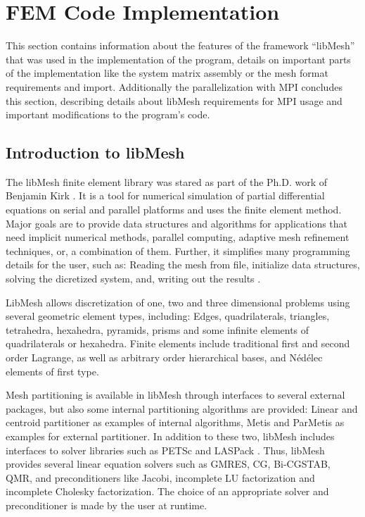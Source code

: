 \section{FEM Code Implementation}
 This section contains information about the features of the framework ``libMesh'' that was used in the implementation of the program, details on important parts of the implementation like the system matrix assembly or the mesh format requirements and import. Additionally the parallelization with MPI concludes this section, describing details about libMesh requirements for MPI usage and important modifications to the program's code.
 
 
 
 \subsection{Introduction to libMesh}\label{sec:Impl-Intro}
 The libMesh finite element library was stared as part of the Ph.D. work of Benjamin Kirk \cite{kirk2007adaptive}. It is a tool for numerical simulation of partial differential equations on serial and parallel platforms and uses the finite element method. Major goals are to provide data structures and algorithms for applications that need implicit numerical methods, parallel computing, adaptive mesh refinement techniques, or, a combination of them. Further, it simplifies many programming details for the user, such as: Reading the mesh from file, initialize data structures, solving the dicretized system, and, writing out the results \cite{kirk2013case}.
 
 LibMesh allows discretization of one, two and three dimensional problems using several geometric element types, including: Edges, quadrilaterals, triangles, tetrahedra, hexahedra, pyramids, prisms and some infinite elements of quadrilaterals or hexahedra. Finite elements include traditional first and second order Lagrange, as well as arbitrary order hierarchical bases, and N\'{e}d\'{e}lec elements of first type.
 
 Mesh partitioning is available in libMesh through interfaces to several external packages, but also some internal partitioning algorithms are provided: Linear and centroid partitioner as examples of internal algorithms, Metis and ParMetis \cite{karypis1998fast} as examples for external partitioner. In addition to these two, libMesh includes interfaces to solver libraries such as PETSc \cite{petsc2015url} and LASPack \cite{laspack2015url}. Thus, libMesh provides several linear equation solvers such as GMRES, CG, Bi-CGSTAB, QMR, and preconditioners like Jacobi, incomplete LU factorization and incomplete Cholesky factorization. The choice of an appropriate solver and preconditioner is made by the user at runtime.
 
